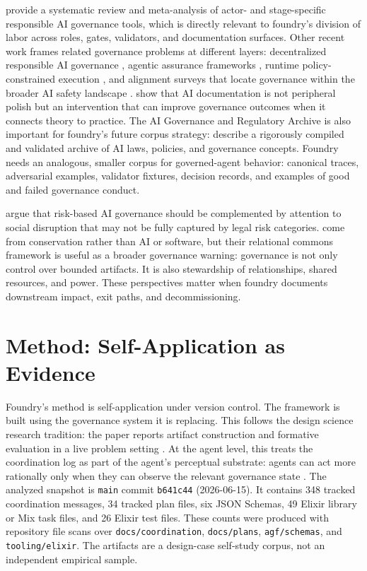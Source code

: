 \documentclass[conference]{IEEEtran}
\begin{document}
\cite{kuehnert2025who} provide a systematic review and meta-analysis of actor- and stage-specific responsible AI governance tools, which is directly relevant to foundry's division of labor across roles, gates, validators, and documentation surfaces. Other recent work frames related governance problems at different layers: decentralized responsible AI governance \cite{jafari2025adaptive}, agentic assurance frameworks \cite{khan2025agentsafe}, runtime policy-constrained execution \cite{qin2026runtime}, and alignment surveys that locate governance within the broader AI safety landscape \cite{ji2025alignment}. \cite{winecoff2025documentation} show that AI documentation is not peripheral polish but an intervention that can improve governance outcomes when it connects theory to practice. The AI Governance and Regulatory Archive is also important for foundry's future corpus strategy: \cite{arnold2024agora} describe a rigorously compiled and validated archive of AI laws, policies, and governance concepts. Foundry needs an analogous, smaller corpus for governed-agent behavior: canonical traces, adversarial examples, validator fixtures, decision records, and examples of good and failed governance conduct.

\cite{marchiori2025social} argue that risk-based AI governance should be complemented by attention to social disruption that may not be fully captured by legal risk categories. \cite{moon2025relational} come from conservation rather than AI or software, but their relational commons framework is useful as a broader governance warning: governance is not only control over bounded artifacts. It is also stewardship of relationships, shared resources, and power. These perspectives matter when foundry documents downstream impact, exit paths, and decommissioning.

\section{Method: Self-Application as Evidence}

Foundry's method is self-application under version control. The framework is built using the governance system it is replacing. This follows the design science research tradition: the paper reports artifact construction and formative evaluation in a live problem setting \cite{hevner2004design,wieringa2014design}. At the agent level, this treats the coordination log as part of the agent's perceptual substrate: agents can act more rationally only when they can observe the relevant governance state \cite{russell2021ai}. The analyzed snapshot is \texttt{main} commit \texttt{b641c44} (2026-06-15). It contains 348 tracked coordination messages, 34 tracked plan files, six JSON Schemas, 49 Elixir library or Mix task files, and 26 Elixir test files. These counts were produced with repository file scans over \texttt{docs/coordination}, \texttt{docs/plans}, \texttt{agf/schemas}, and \texttt{tooling/elixir}. The artifacts are a design-case self-study corpus, not an independent empirical sample.
\end{document}
